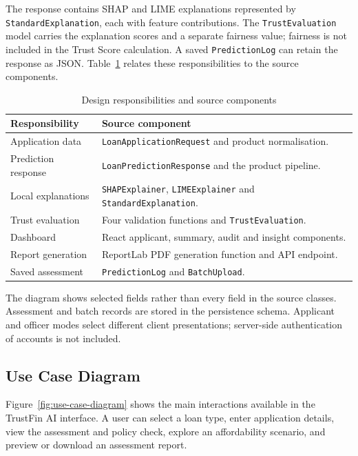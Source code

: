 The response contains SHAP and LIME explanations represented by \texttt{StandardExplanation}, each with feature contributions. The \texttt{TrustEvaluation} model carries the explanation scores and a separate fairness value; fairness is not included in the Trust Score calculation. A saved \texttt{PredictionLog} can retain the response as JSON. Table~\ref{tab:design-source-map} relates these responsibilities to the source components.


\begin{table}[htbp]\centering\small
\caption{Design responsibilities and source components}\label{tab:design-source-map}
\begin{tabularx}{\textwidth}{p{3.8cm}X}\toprule
Responsibility & Source component\\\midrule
Application data & \texttt{LoanApplicationRequest} and product normalisation.\\
Prediction response & \texttt{LoanPredictionResponse} and the product pipeline.\\
Local explanations & \texttt{SHAPExplainer}, \texttt{LIMEExplainer} and \texttt{StandardExplanation}.\\
Trust evaluation & Four validation functions and \texttt{TrustEvaluation}.\\
Dashboard & React applicant, summary, audit and insight components.\\
Report generation & ReportLab PDF generation function and API endpoint.\\
Saved assessment & \texttt{PredictionLog} and \texttt{BatchUpload}.\\\bottomrule
\end{tabularx}\end{table}

The diagram shows selected fields rather than every field in the source classes. Assessment and batch records are stored in the persistence schema. Applicant and officer modes select different client presentations; server-side authentication of accounts is not included.

\subsection{Use Case Diagram}
Figure~\ref{fig:use-case-diagram} shows the main interactions available in the TrustFin AI interface. A user can select a loan type, enter application details, view the assessment and policy check, explore an affordability scenario, and preview or download an assessment report.

